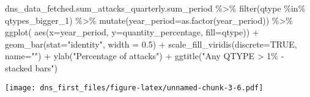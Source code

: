 \documentclass[
]{article}
\newenvironment{Shaded}{\begin{snugshade}}{\end{snugshade}}
\newcommand{\AttributeTok}[1]{\textcolor[rgb]{0.77,0.63,0.00}{#1}}
\newcommand{\ConstantTok}[1]{\textcolor[rgb]{0.00,0.00,0.00}{#1}}
\newcommand{\FloatTok}[1]{\textcolor[rgb]{0.00,0.00,0.81}{#1}}
\newcommand{\FunctionTok}[1]{\textcolor[rgb]{0.00,0.00,0.00}{#1}}
\newcommand{\NormalTok}[1]{#1}
\newcommand{\SpecialCharTok}[1]{\textcolor[rgb]{0.00,0.00,0.00}{#1}}
\newcommand{\StringTok}[1]{\textcolor[rgb]{0.31,0.60,0.02}{#1}}
\begin{document}
\begin{Shaded}
\begin{Highlighting}[]
\NormalTok{dns\_data\_fetched.sum\_attacks\_quarterly.sum\_period }\SpecialCharTok{\%\textgreater{}\%}
  \FunctionTok{filter}\NormalTok{(qtype }\SpecialCharTok{\%in\%}\NormalTok{ qtypes\_bigger\_1) }\SpecialCharTok{\%\textgreater{}\%}
  \FunctionTok{mutate}\NormalTok{(}\AttributeTok{year\_period=}\FunctionTok{as.factor}\NormalTok{(year\_period)) }\SpecialCharTok{\%\textgreater{}\%}
  \FunctionTok{ggplot}\NormalTok{( }\FunctionTok{aes}\NormalTok{(}\AttributeTok{x=}\NormalTok{year\_period, }\AttributeTok{y=}\NormalTok{quantity\_percentage, }\AttributeTok{fill=}\NormalTok{qtype)) }\SpecialCharTok{+}
    \FunctionTok{geom\_bar}\NormalTok{(}\AttributeTok{stat=}\StringTok{"identity"}\NormalTok{, }\AttributeTok{width =} \FloatTok{0.5}\NormalTok{) }\SpecialCharTok{+}
    \FunctionTok{scale\_fill\_viridis}\NormalTok{(}\AttributeTok{discrete=}\ConstantTok{TRUE}\NormalTok{, }\AttributeTok{name=}\StringTok{""}\NormalTok{) }\SpecialCharTok{+}
    \FunctionTok{ylab}\NormalTok{(}\StringTok{"Percentage of attacks"}\NormalTok{) }\SpecialCharTok{+}
    \FunctionTok{ggtitle}\NormalTok{(}\StringTok{"Any QTYPE \textgreater{} 1\% {-} stacked bars"}\NormalTok{)}
\end{Highlighting}
\end{Shaded}

\texttt{[image: dns\_first\_files/figure-latex/unnamed-chunk-3-6.pdf]}
\end{document}
